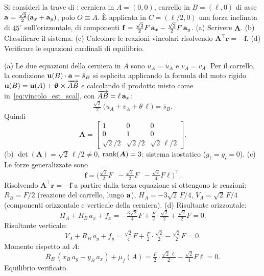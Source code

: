 \begin{esercizio}
	\label{ex:C05_trave_inclinata_stat}
	
	Si consideri la trave di :
	cerniera in $A=(0,0)$, carrello in $B=(\ell,0)$ di asse
	$\mathbf{a}=\tfrac{\sqrt{2}}{2}(\mathbf{a}_x+\mathbf{a}_y)$, polo $O\equiv A$.
	È applicata in $C=(\ell/2,0)$ una forza inclinata di
	$45^\circ$ sull'orizzontale, di componenti
	$\mathbf{f}=\tfrac{\sqrt{2}}{2}F\,\mathbf{a}_x-\tfrac{\sqrt{2}}{2}F\,\mathbf{a}_y$.
	(a) Scrivere $\bm{A}$. (b) Classificare il sistema.
	(c) Calcolare le reazioni vincolari risolvendo
	$\bm{A}^\top\bm{r}=-\bm{f}$.
	(d) Verificare le equazioni cardinali di equilibrio.
	
	\risultato (a) Le due equazioni della cerniera in $A$ sono
	$u_A=\bar{u}_A$ e $v_A=\bar{v}_A$. Per il carrello, la
	condizione $\mathbf{u}(B)\cdot\mathbf{a}=\bar{s}_B$ si esplicita applicando
	la formula del moto rigido $\mathbf{u}(B)=\mathbf{u}(A)+\bm{\upvartheta}\times
	\overrightarrow{AB}$ e calcolando il prodotto misto come
	in~\eqref{eq:vincolo_est_scal}, con $\overrightarrow{AB}=\ell\,\mathbf{a}_x$:
	\[
	\tfrac{\sqrt{2}}{2}\,\bigl(u_A+v_A+\theta\,\ell\bigr)
	=\bar{s}_B.
	\]
	Quindi
	\[
	\bm{A}=
	\begin{bmatrix}
		1 & 0 & 0\\
		0 & 1 & 0\\
		\sqrt{2}/2 & \sqrt{2}/2 & \sqrt{2}\,\ell/2
	\end{bmatrix}.
	\]
	(b) $\det(\bm{A})=\sqrt{2}\,\ell/2\neq 0$, $\operatorname{rank}(\bm{A})=3$:
	sistema isostatico ($g_\ell=g_{\mathscr{i}}=0$).
	(c) Le forze generalizzate sono
	\[
	\bm{f}=\bigl(\tfrac{\sqrt{2}}{2}F\;\;
	-\tfrac{\sqrt{2}}{2}F\;\;
	-\tfrac{\sqrt{2}}{4}F\ell\bigr)^\top.
	\]
	Risolvendo $\bm{A}^\top\bm{r}=-\bm{f}$ a partire dalla terza
	equazione si ottengono le reazioni: $R_B=F/2$ (reazione del
	carrello, lungo $\mathbf{a}$), $H_A=-3\sqrt{2}\,F/4$,
	$V_A=\sqrt{2}\,F/4$ (componenti orizzontale e verticale della
	cerniera).
	(d) Risultante orizzontale:
	\[
	H_A+R_B\,a_x+f_x
	=-\tfrac{3\sqrt{2}}{4}F+\tfrac{F}{2}\cdot\tfrac{\sqrt{2}}{2}
	+\tfrac{\sqrt{2}}{2}F=0.
	\]
	Risultante verticale:
	\[
	V_A+R_B\,a_y+f_y
	=\tfrac{\sqrt{2}}{4}F+\tfrac{F}{2}\cdot\tfrac{\sqrt{2}}{2}
	-\tfrac{\sqrt{2}}{2}F=0.
	\]
	Momento rispetto ad $A$:
	\[
	R_B\,(x_B\,a_y - y_B\,a_x) + \mu_f(A)
	=\tfrac{F}{2}\cdot\tfrac{\sqrt{2}\,\ell}{2}
	-\tfrac{\sqrt{2}}{4}F\ell=0.
	\]
	Equilibrio verificato.
\end{esercizio}

